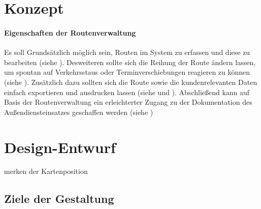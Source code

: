 \documentclass[Bachelorarbeit.tex]{subfiles}
\begin{document}
\section{Konzept}
\label{chap:entwicklung:sec:konzept}


\paragraph{Eigenschaften der Routenverwaltung}

Es soll Grundsätzlich möglich sein, Routen im System zu erfassen und diese zu bearbeiten (siehe ).
Desweiteren sollte sich die Reihung der Route ändern lassen, um spontan auf Verkehrsstaus oder Terminverschiebungen reagieren zu können (siehe ).
Zusätzlich dazu sollten sich die Route sowie die kundenrelevanten Daten einfach exportieren und ausdrucken lassen (siehe  und ). 
Abschließend kann auf Basis der Routenverwaltung ein erleichterter Zugang zu der Dokumentation des Außendiensteinsatzes geschaffen werden (siehe )

\section{Design-Entwurf}
\label{chap:entwicklung:sec:design_entwurf}

merken der Kartenposition


\subsection{Ziele der Gestaltung}
\label{chap:entwicklung:sec:design_entwurf:subs:ziele_der_gestaltung}
\end{document}
